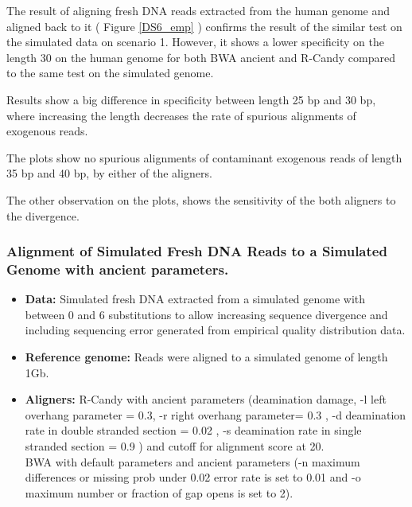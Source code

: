 \documentclass[11pt,a4paper]{report}
\begin{document}
The result of aligning fresh DNA reads extracted from the human genome and 
aligned back to it ( Figure \ref{DS6_emp} ) confirms the result of the similar 
test on the simulated data on scenario 1.  However, it shows a lower specificity 
on the length 30 on the human genome for both BWA ancient and R-Candy compared
to the same test on the simulated genome.

Results show a big difference in specificity between length 25 bp and 30 bp, 
where increasing the length decreases the rate of spurious alignments of exogenous
reads.

The plots show no spurious alignments of contaminant exogenous reads of length 
35 bp and 40 bp, by either of the aligners.

The other observation on the plots, shows the sensitivity of the both aligners
to the divergence.




 \subsubsection {Alignment of Simulated Fresh DNA Reads to a Simulated Genome 
 with ancient parameters.}

 \label {Alignment of Simulated Fresh DNA Reads to a Simulated Genome with
 ancient parameters.}
 

  \begin{itemize}

   \item \textbf{Data:} Simulated fresh DNA extracted from a simulated genome 
   with between 0 and 6 substitutions to allow increasing sequence divergence
   and including sequencing error generated from empirical quality distribution 
   data.
 
   
   \item \textbf{Reference genome:} Reads were aligned to a simulated genome of 
   length 1Gb.

    \item \textbf{Aligners:}
    R-Candy with ancient parameters (deamination damage, -l left overhang 
    parameter = 0.3, -r right overhang parameter= 0.3 , -d deamination rate 
    in double stranded section = 0.02 , -s deamination rate in single stranded 
    section = 0.9 ) and cutoff for alignment score at 20. \\
    BWA with default parameters and ancient parameters 
    (-n maximum differences or missing prob under 0.02 error rate is set to 0.01 
     and -o maximum number or fraction of gap opens is set to 2)\cite{green2010draft}.

   
   \end{itemize}
 
\end{document}
